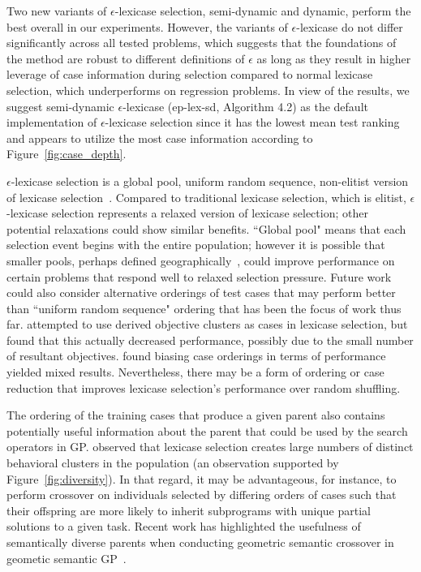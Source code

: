 \documentclass[twoside]{article}
\begin{document}
Two new variants of $\epsilon$-lexicase selection, semi-dynamic and dynamic, perform the best overall in our experiments. However, the variants of $\epsilon$-lexicase do not differ significantly across all tested problems, which suggests that the foundations of the method are robust to different definitions of $\epsilon$ as long as they result in higher leverage of case information during selection compared to normal lexicase selection, which underperforms on regression problems. In view of the results, we suggest semi-dynamic $\epsilon$-lexicase (ep-lex-sd, Algorithm 4.2) as the default implementation of $\epsilon$-lexicase selection since it has the lowest mean test ranking and appears to utilize the most case information according to Figure~\ref{fig:case_depth}. 
 
$\epsilon$-lexicase selection is a global pool, uniform random sequence, non-elitist version of lexicase selection~\citep{spector_assessment_2012}. Compared to traditional lexicase selection, which is elitist, $\epsilon$-lexicase selection represents a relaxed version of lexicase selection; other potential relaxations could show similar benefits. ``Global pool" means that each selection event begins with the entire population; however it is possible that smaller pools, perhaps defined geographically~\citep{spector_trivial_2006}, could improve performance on certain problems that respond well to relaxed selection pressure. Future work could also consider alternative orderings of test cases that may perform better than ``uniform random sequence" ordering that has been the focus of work thus far. \cite{liskowski_comparison_2015} attempted to use derived objective clusters as cases in lexicase selection, but found that this actually decreased performance, possibly due to the small number of resultant objectives. \cite{burks_gptp_2016} found biasing case orderings in terms of performance yielded mixed results. Nevertheless, there may be a form of ordering or case reduction that improves lexicase selection's performance over random shuffling.   
 
The ordering of the training cases that produce a given parent also contains potentially useful information about the parent that could be used by the search operators in GP. \cite{helmuth_general_2015-1} observed that lexicase selection creates large numbers of distinct behavioral clusters in the population (an observation supported by Figure~\ref{fig:diversity}). In that regard, it may be advantageous, for instance, to perform crossover on individuals selected by differing orders of cases such that their offspring are more likely to inherit subprograms with unique partial solutions to a given task. Recent work has highlighted the usefulness of semantically diverse parents when conducting geometric semantic crossover in geometic semantic GP~\citep{Chen2017}.   
\end{document}
